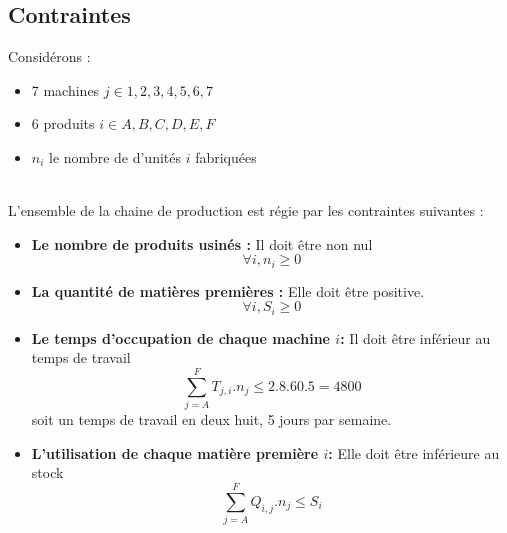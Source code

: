 \subsection{Contraintes}
Considérons :
\begin{itemize}
  \item 7 machines $j \in {1, 2, 3, 4, 5, 6 ,7}$
  \item 6 produits $i \in {A, B, C, D, E, F}$
  \item $n_i$ le nombre de d'unités $i$ fabriquées
\end{itemize}
~\\
L'ensemble de la chaine de production est régie par les contraintes suivantes
:\\
\begin{itemize}
  \item \textbf{Le nombre de produits usinés :} Il doit être non nul
  \begin{equation} 
  	\forall i, n_i \ge 0 \label{C0}
  \end{equation}
  
  \item \textbf{La quantité de matières premières :} Elle doit
  être positive.
  \begin{equation} 
  	\forall i, S_i \ge 0 \label{C0}
  \end{equation}
  
  \item \textbf{Le temps d'occupation de chaque machine $i$:} Il doit être
  inférieur au temps de travail
  \begin{equation} 
  	\sum_{j = A}^{F} T_{j,i} . n_j \leq 2.8.60.5 = 4800 \label{C1}
  \end{equation} 
  soit un temps de travail en deux huit, 5 jours par semaine.
  
  \item \textbf{L'utilisation de chaque matière première  $i$:} Elle doit être
  inférieure au stock
  \begin{equation} 
  	\sum_{j = A}^{F} Q_{i,j} . n_j \leq S_i \label{C2}
  \end{equation} 
\end{itemize}




